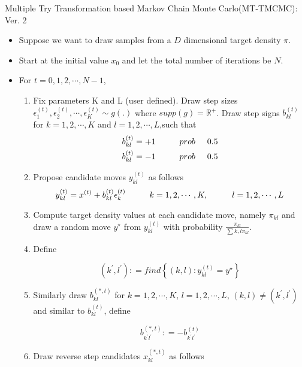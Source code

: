 \begin{algorithm}
\caption{\small{Multiple Try Transformation based Markov Chain Monte Carlo(MT-TMCMC): Ver. 2}}\label{mt-tmcmc-ver1}
\begin{itemize}
\item Suppose we want to draw samples from a $D$ dimensional target density $\pi$. 
\item Start at the initial value $x_{0}$ and let the total number of iterations be $N$. 
\item For $t=0,1,2,\cdots, N-1$,
\begin{enumerate}
\item Fix parameters K and L (user defined). Draw step sizes $\epsilon^{(t)}_{1}, \epsilon^{(t)}_{2}, \cdots, \epsilon^{(t)}_{K} \sim g(.)$ where $supp(g) =\mathbb{R}^{+}$.  Draw step signs  $b^{(t)}_{kl}$ for $k=1,2, \cdots, K$ and $l=1,2, \cdots, L$,such that 
\begin{align*}
b^{(t)}_{kl} = + 1 \hspace{1 cm} prob \hspace{0.5 cm} 0.5 \\
b^{(t)}_{kl} = - 1 \hspace{1 cm} prob \hspace{0.5 cm} 0.5 
\end{align*}
\item Propose candidate moves $y^{(t)}_{kl}$ as follows 
$$ y^{(t)}_{kl} = x^{(t)} + b^{(t)}_{kl}\epsilon^{(t)}_{k} \hspace{1 cm} k=1,2,\cdots, K, \hspace{1 cm} l=1,2,\cdots, L $$

\item Compute target density values at each candidate move, namely $\pi_{kl}$ and draw a random move $y^{\star}$ 
from $y^{(t)}_{kl}$ with probability $ \frac{\pi_{kl}} {\sum{k,l} \pi_{kl}}$.

\item Define 

$$ (k^{'}, l^{'}) : = find \left \{(k,l): y^{(t)}_{kl} = y^{\star} \right \} $$

\item Similarly draw $b^{(*,t)}_{kl}$ for $k=1,2, \cdots, K$, $l=1,2,\cdots, L$,  $(k,l) \neq (k^{'}, l^{'})$ and similar to $b^{(t)}_{kl}$, define 

$$ b^{(*,t)}_{k^{'}l^{'}} : = - b^{(t)}_{k^{'}l^{'}} $$

\item Draw reverse step candidates $x^{(*,t)}_{kl}$ as follows 


\end{enumerate}
\end{itemize}
\end{algorithm}

